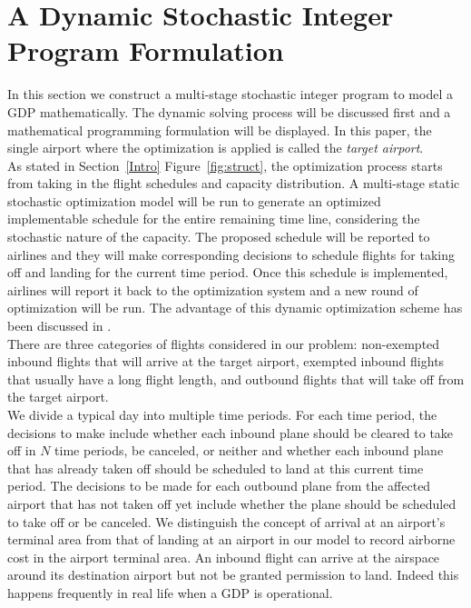 \documentclass[12pt]{article}
\begin{document}
\section{A Dynamic Stochastic Integer Program Formulation}\label{Model}
	In this section we construct a multi-stage stochastic integer program to model a GDP mathematically. The dynamic solving process will be discussed first and a mathematical programming formulation will be displayed. In this paper, the single airport where the optimization is applied is called the {\em target airport}.\\
	\newline As stated in Section~\ref{Intro} Figure~\ref{fig:struct}, the optimization process starts from taking in the flight schedules and capacity distribution. A multi-stage static stochastic optimization model will be run to generate an optimized implementable schedule for the entire remaining time line, considering the stochastic nature of the capacity. The proposed schedule will be reported to airlines and they will make corresponding decisions to schedule flights for taking off and landing for the current time period. Once this schedule is implemented, airlines will report it back to the optimization system and a new round of optimization will be run. The advantage of this dynamic optimization scheme has been discussed in \cite{richetta1994dynamic}. \\
	\newline There are three categories of flights considered in our problem: non-exempted inbound flights that will arrive at the target airport, exempted inbound flights that usually have a long flight length, and outbound flights that will take off from the target airport. \\
	\newline
	We divide a typical day into multiple time periods. For each time period, the decisions to make include whether each inbound plane should be cleared to take off in \(N\) time periods, be canceled, or neither and whether each inbound plane that has already taken off should be scheduled to land at this current time period. The decisions to be made for each outbound plane from the affected airport that has not taken off yet include whether the plane should be scheduled to take off or be canceled. We distinguish the concept of arrival at an airport's terminal area from that of landing at an airport in our model to record airborne cost in the airport terminal area. An inbound flight can arrive at the airspace around its destination airport but not be granted permission to land.  Indeed this happens frequently in real life when a GDP is operational.
\end{document}
